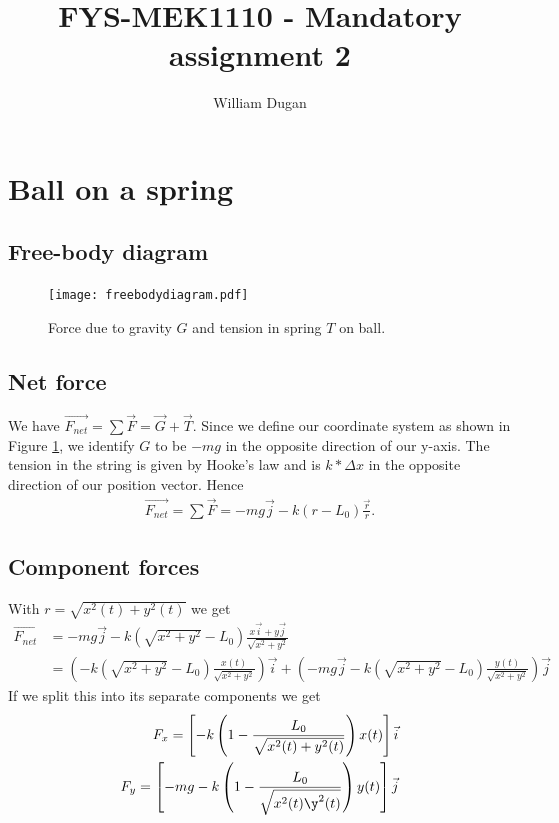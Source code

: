 \documentclass[a4paper,10pt,english]{article}
\title{FYS-MEK1110 - Mandatory assignment 2}
\author{William Dugan}
\begin{document}
\maketitle

\section{Ball on a spring}
\subsection{Free-body diagram}

\begin{figure}[h!]
        \centering 
        \texttt{[image: freebodydiagram.pdf]} 
        \caption{Force due to gravity $G$ and tension in spring $T$ on ball.}
        \label{fig:forces}
\end{figure}

\subsection{Net force}
We have $\Vec{F_{net}} = \sum \Vec{F} = \Vec{G} + \Vec{T}$. Since we define our coordinate system as shown in Figure \ref{fig:forces}, we identify $G$ to be $-mg$ in the opposite direction of our y-axis. The tension in the string is given by Hooke's law and is $k * \Delta x$ in the opposite direction of our position vector. Hence
\begin{align}
    \Vec{F_{net}} 
    = \sum \Vec{F}
    = -mg\Vec{j} - k(r-L_0)\frac{\Vec{r}}{r}.
    \label{force-eq}
\end{align} 

\subsection{Component forces}
With $r = \sqrt{x^2(t)+y^2(t)}$ we get
\begin{align*}
    \Vec{F_{net}} 
    &= -mg\Vec{j} -k(\sqrt{x^2+y^2}-L_0)\frac{x\Vec{i} +         y\Vec{j}}{\sqrt{x^2+y^2}} \\
    &= \left( -k(\sqrt{x^2+y^2}-L_0) \frac{x(t)}{\sqrt{x^2+y^2}} \right)\Vec{i}
        + \left( -mg\Vec{j} - k(\sqrt{x^2+y^2}-L_0)\frac{    y(t)}{\sqrt{x^2+y^2}} \right) \Vec{j}
\end{align*}
If we split this into its separate components we get
\begin{align}
    F_x = \left[ -k\left(1-\frac{L_0}{\sqrt{x^2(t)+y^2(t)}}\right) x(t) \right] \Vec{i} \\
    F_y = \left[ -mg - k\left(1-\frac{L_0}{\sqrt{x^2(t)\y^2(t)}}\right) y(t) \right] \Vec{j}
\end{align}
\end{document}

